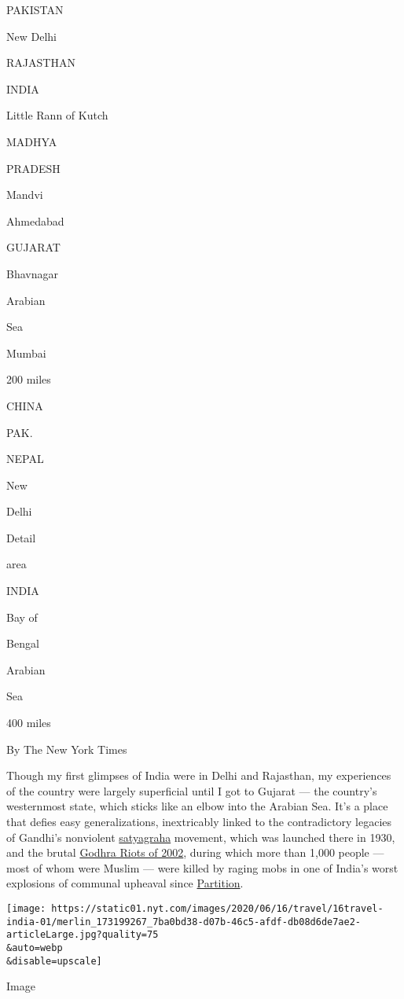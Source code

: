 PAKISTAN

New Delhi

RAJASTHAN

INDIA

Little Rann of Kutch

MADHYA

PRADESH

Mandvi

Ahmedabad

GUJARAT

Bhavnagar

Arabian

Sea

Mumbai

200 miles

CHINA

PAK.

NEPAL

New

Delhi

Detail

area

INDIA

Bay of

Bengal

Arabian

Sea

400 miles

By The New York Times

Though my first glimpses of India were in Delhi and Rajasthan, my
experiences of the country were largely superficial until I got to
Gujarat --- the country's westernmost state, which sticks like an elbow
into the Arabian Sea. It's a place that defies easy generalizations,
inextricably linked to the contradictory legacies of Gandhi's nonviolent
\href{http://blogs.law.columbia.edu/uprising1313/bernard-e-harcourt-introduction-to-satyagraha/}{satyagraha}
movement, which was launched there in 1930, and the brutal
\href{https://www.nytimes.com/interactive/2014/04/06/world/asia/modi-gujarat-riots-timeline.html}{Godhra
Riots of 2002}, during which more than 1,000 people --- most of whom
were Muslim --- were killed by raging mobs in one of India's worst
explosions of communal upheaval since
\href{https://www.newyorker.com/magazine/2015/06/29/the-great-divide-books-dalrymple}{Partition}.

\texttt{[image: https://static01.nyt.com/images/2020/06/16/travel/16travel-india-01/merlin\_173199267\_7ba0bd38-d07b-46c5-afdf-db08d6de7ae2-articleLarge.jpg?quality=75\\\&auto=webp\\\&disable=upscale]}

Image

